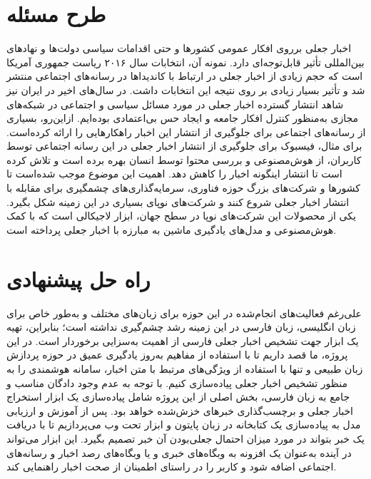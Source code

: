 \section{طرح مسئله}
اخبار جعلی برروی افکار  عمومی کشورها و حتی اقدامات سیاسی دولت‌ها و نهادهای بین‌المللی تأثیر قابل‌توجه‌ای دارد. نمونه آن، انتخابات سال ۲۰۱۶  ریاست جمهوری آمریکا است که حجم زیادی از اخبار جعلی در ارتباط با کاندیداها در رسانه‌های اجتماعی منتشر شد و تأثیر بسیار  زیادی بر روی نتیجه این انتخابات داشت. در سال‌های اخیر در ایران نیز شاهد انتشار گسترده اخبار جعلی در مورد مسائل سیاسی  و اجتماعی در شبکه‌های مجازی به‌منظور کنترل افکار جامعه و ایجاد حس بی‌اعتمادی بوده‌ایم. ازاین‌رو، بسیاری از رسانه‌های اجتماعی برای جلوگیری از انتشار این اخبار راهکارهایی را ارائه کرده‌است. برای مثال، فیسبوک برای جلوگیری از انتشار اخبار  جعلی در این رسانه اجتماعی توسط کاربران، از هوش‌مصنوعی و بررسی محتوا توسط انسان بهره برده‌ است و تلاش کرده‌ است تا انتشار  اینگونه اخبار را کاهش دهد. اهمیت این موضوع موجب شده‌است تا کشورها و شرکت‌های بزرگ حوزه فناوری، سرمایه‌گذاری‌های چشمگیری برای مقابله با انتشار اخبار جعلی شروع کنند و شرکت‌های نوپای بسیاری در این زمینه شکل بگیرد. یکی از محصولات  این شرکت‌های نوپا در سطح جهان، ابزار لاجیکالی است که با کمک هوش‌مصنوعی و مدل‌های یادگیری ماشین به مبارزه با اخبار جعلی پرداخته است.

\section{راه حل پیشنهادی}
 علی‌رغم فعالیت‌های انجام‌شده در این حوزه برای زبان‌های مختلف و به‌طور خاص برای زبان انگلیسی، زبان فارسی در این زمینه رشد چشم‌گیری نداشته است؛ بنابراین، تهیه یک ابزار جهت تشخیص اخبار جعلی فارسی از اهمیت به‌سزایی برخوردار است. در این پروژه، ما قصد داریم تا با استفاده از مفاهیم به‌روز یادگیری عمیق در حوزه پردازش زبان طبیعی و تنها با استفاده از ویژگی‌های مرتبط با متن اخبار، سامانه‌ هوشمندی را به منظور تشخیص اخبار جعلی پیاده‌سازی کنیم. با توجه به عدم وجود دادگان مناسب و جامع به زبان فارسی، بخش اصلی از این پروژه شامل پیاده‌سازی یک ابزار استخراج اخبار جعلی و برچسب‌گذاری خبر‌های خزش‌شده خواهد بود. پس از آموزش و ارزیابی مدل به پیاده‌سازی یک کتابخانه در زبان پایتون و ابزار تحت وب می‌پردازیم تا با دریافت یک خبر بتواند در مورد میزان احتمال جعلی‌بودن آن خبر تصمیم بگیرد. این ابزار می‌تواند در آینده به‌عنوان یک افزونه به وبگاه‌های خبری و یا وبگاه‌های رصد اخبار و رسانه‌های اجتماعی اضافه شود و کاربر را در  راستای اطمینان از صحت اخبار راهنمایی کند.